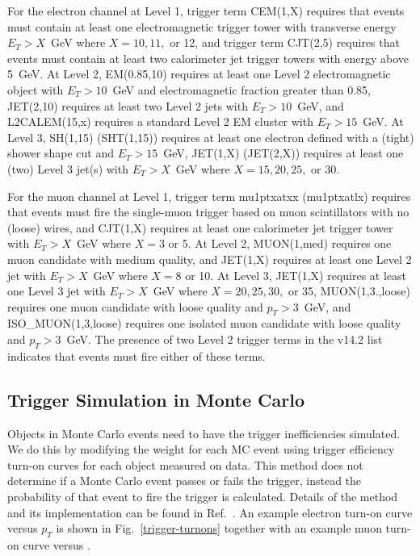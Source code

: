 \vspace{-0.2in}
For the electron channel at Level 1, trigger term CEM(1,X) requires
that events must contain at least one electromagnetic trigger tower
with transverse energy $E_T > X$~GeV where $X = 10, 11,$ or 12, and
trigger term CJT(2,5) requires that events must contain at least two
calorimeter jet trigger towers with energy above 5~GeV. At Level 2,
EM(0.85,10) requires at least one Level 2 electromagnetic object with
$E_T > 10$~GeV and electromagnetic fraction greater than 0.85,
JET(2,10) requires at least two Level 2 jets with $E_T > 10$~GeV, and
L2CALEM(15,x) requires a standard Level 2 EM cluster with $E_T >
15$~GeV. At Level 3, SH(1,15) (SHT(1,15)) requires at least one
electron defined with a (tight) shower shape cut and $E_T > 15$~GeV,
JET(1,X) (JET(2,X)) requires at least one (two) Level 3 jet(s) with
$E_T > X$~GeV where $X = 15, 20, 25,$ or 30.

For the muon channel at Level 1, trigger term mu1ptxatxx (mu1ptxatlx)
requires that events must fire the single-muon trigger based on muon
scintillators with no (loose) wires, and CJT(1,X) requires at least
one calorimeter jet trigger tower with $E_T > X$~GeV where $X = 3$ or
5. At Level 2, MUON(1,med) requires one muon candidate with medium
quality, and JET(1,X) requires at least one Level 2 jet with $E_T >
X$~GeV where $X = 8$ or 10. At Level 3, JET(1,X) requires at least one
Level 3 jet with $E_T > X$~GeV where $X = 20, 25, 30,$ or 35,
MUON(1,3.,loose) requires one muon candidate with loose quality and
$p_T > 3$~GeV, and ISO\_MUON(1,3,loose) requires one isolated muon
candidate with loose quality and $p_T > 3$~GeV. The presence of
two Level 2 trigger terms in the v14.2 list indicates that events must
fire either of these terms.

\subsection{Trigger Simulation in Monte Carlo}
\label{trigger-simulation}

Objects in Monte Carlo events need to have the trigger inefficiencies
simulated. We do this by modifying the weight for each MC event using
trigger efficiency turn-on curves for each object measured on
data. This method does not determine if a Monte Carlo event passes or
fails the trigger, instead the probability of that event to fire the
trigger is calculated.  Details of the method and its implementation
can be found in Ref.~\cite{d0_note_4512,d0_note_4882,caf_trigger}. An
example electron turn-on curve versus $p_T$ is shown in
Fig.~\ref{trigger-turnons} together with an example muon turn-on curve
versus {\deta}.

